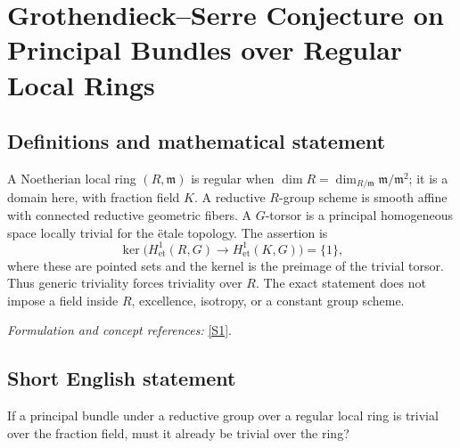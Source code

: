 \documentclass[11pt,a4paper]{article}
\newcommand{\sref}[2]{\hyperlink{source:#1:#2}{[S#2]}}
\newif\ifshowcatalogue
\newcommand{\cataloguescope}[1]{\ifshowcatalogue
 \paragraph{Exact scope in the supplied catalogue.}
 \begin{quote}\small #1\end{quote}\fi}
\numberwithin{equation}{section}
\begin{document}
\setcounter{section}{191}
\clearpage
\section{\texorpdfstring{Grothendieck–Serre Conjecture on Principal Bundles over Regular Local Rings}{Grothendieck–Serre Conjecture on Principal Bundles over Regular Local Rings}}\label{192}
\subsection{Definitions and mathematical statement}
A Noetherian local ring $(R,\mathfrak m)$ is regular when
$\dim R=\dim_{R/\mathfrak m}\mathfrak m/\mathfrak m^2$; it is a domain here, with fraction field $K$. A reductive $R$-group scheme is smooth affine with connected reductive geometric fibers. A $G$-torsor is a principal homogeneous space locally trivial for the \"etale topology. The assertion is
\[
 \ker\bigl(H^1_{\mathrm{et}}(R,G)\to H^1_{\mathrm{et}}(K,G)\bigr)=\{1\},
\]
where these are pointed sets and the kernel is the preimage of the trivial torsor. Thus generic triviality forces triviality over $R$. The exact statement does not impose a field inside $R$, excellence, isotropy, or a constant group scheme.
\par\smallskip\textit{Formulation and concept references:} \sref{192}{1}.
\cataloguescope{For every commutative Noetherian regular local ring R, with fraction field K=Frac(R), and every reductive R-group scheme G (smooth affine with connected reductive geometric fibers), every G-torsor over Spec(R) that becomes trivial over Spec(K) is already trivial over Spec(R). Equivalently, the natural map of nonabelian pointed sets H\textasciicircum{}1\_et(R,G) -> H\textasciicircum{}1\_et(K,G) has trivial kernel. Regular local rings here are domains. No field-containing, excellence, finite-type, unramified, quasi-split, isotropic or constant-group restriction is imposed.}
\subsection{Short English statement}
If a principal bundle under a reductive group over a regular local ring is trivial over the fraction field, must it already be trivial over the ring?
\end{document}
